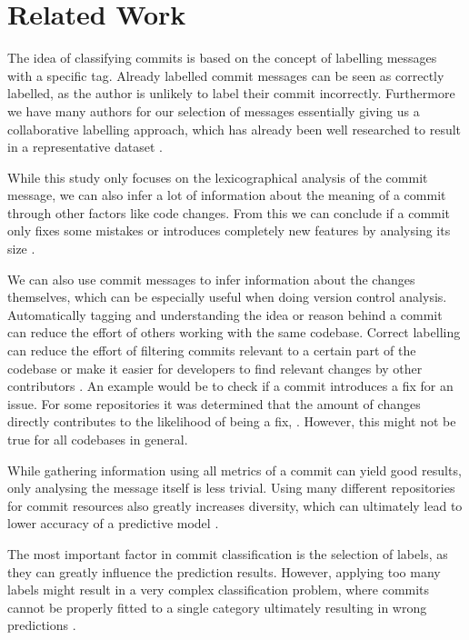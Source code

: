 \section{Related Work}
\label{sec:related-work}

The idea of classifying commits is based on the concept of labelling
messages with a specific tag. Already labelled commit messages can be
seen as correctly labelled, as the author is unlikely to label their commit
incorrectly. Furthermore we have many authors for our selection of
messages essentially giving us a collaborative labelling approach,
which has already been well researched to result in a representative
dataset \cite{Golder2006}.

While this study only focuses on the lexicographical analysis of the
commit message, we can also infer a lot of information about the meaning
of a commit through other factors like code changes. From this we can
conclude if a commit only fixes some mistakes or introduces completely
new features by analysing its size \cite{Hindle2008}.

We can also use commit messages to infer information about the
changes themselves, which can be especially useful when doing version
control analysis. Automatically tagging and understanding the idea
or reason behind a commit can reduce the effort of others working
with the same codebase. Correct labelling can reduce the effort
of filtering commits relevant to a certain part of the codebase or
make it easier for developers to find relevant changes by other
contributors \cite{Mockus2000}. An example would be to check if
a commit introduces a fix for an issue. For some repositories
it was determined that the amount of changes directly contributes
to the likelihood of being a fix, \cite{Sliwerski2005}. However,
this might not be true for all codebases in general.

While gathering information using all metrics of a commit can yield
good results, only analysing the message itself is less trivial.
Using many different repositories for commit resources also greatly
increases diversity, which can ultimately lead to lower accuracy
of a predictive model \cite{Mockus2000,Santos2020}.

The most important factor in commit classification is the selection
of labels, as they can greatly influence the prediction results.
However, applying too many labels might result in a very complex
classification problem, where commits cannot be properly fitted
to a single category ultimately resulting in wrong predictions
\cite{Santos2020}.
